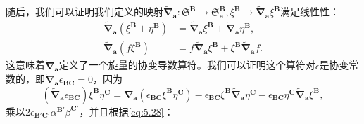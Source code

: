 随后，我们可以证明我们定义的映射$\tilde{\boldsymbol{\nabla }}_{\boldsymbol{a}} :\mathfrak{S}^{\boldsymbol{B}}\rightarrow \mathfrak{S}_{\boldsymbol{a}}^{\boldsymbol{B}} ,\xi ^{\boldsymbol{B}}\rightarrow \tilde{\boldsymbol{\nabla }}_{\boldsymbol{a}} \xi ^{\boldsymbol{B}}$满足线性性：
\begin{equation*}
	\begin{aligned}
		\tilde{\boldsymbol{\nabla }}_{\boldsymbol{a}} (\xi ^{\boldsymbol{B}} +\eta ^{\boldsymbol{B}} ) & =\tilde{\boldsymbol{\nabla }}_{\boldsymbol{a}} \xi ^{\boldsymbol{B}} +\tilde{\boldsymbol{\nabla }}_{\boldsymbol{a}} \eta ^{\boldsymbol{B}} ,\\
		\tilde{\boldsymbol{\nabla }}_{\boldsymbol{a}} (f\xi ^{\boldsymbol{B}} ) & =f\tilde{\boldsymbol{\nabla }}_{\boldsymbol{a}} \xi ^{\boldsymbol{B}} +\xi ^{\boldsymbol{B}}\tilde{\boldsymbol{\nabla }}_{\boldsymbol{a}} f.
	\end{aligned}
\end{equation*}
这意味着$\tilde{\boldsymbol{\nabla }}_{\boldsymbol{a}}$定义了一个旋量的协变导数算符。我们可以证明这个算符对$\epsilon $是协变常数的，即$\tilde{\boldsymbol{\nabla }}_{\boldsymbol{a}} \epsilon _{\boldsymbol{BC}} =0$，因为
\begin{equation}
	(\tilde{\boldsymbol{\nabla }}_{\boldsymbol{a}} \epsilon _{\boldsymbol{BC}} )\xi ^{\boldsymbol{B}} \eta ^{\boldsymbol{C}} =\boldsymbol{\nabla }_{\boldsymbol{a}} (\epsilon _{\boldsymbol{BC}} \xi ^{\boldsymbol{B}} \eta ^{\boldsymbol{C}} )-\epsilon _{\boldsymbol{BC}} \xi ^{\boldsymbol{B}}\tilde{\boldsymbol{\nabla }}_{\boldsymbol{a}} \eta ^{\boldsymbol{C}} -\epsilon _{\boldsymbol{BC}} \eta ^{\boldsymbol{C}}\tilde{\boldsymbol{\nabla }}_{\boldsymbol{a}} \xi ^{\boldsymbol{B}} ,
	\label{eq:5.30}
\end{equation}
乘以$2\epsilon _{\boldsymbol{B} '\boldsymbol{C} '} \alpha ^{\boldsymbol{B} '} \beta ^{\boldsymbol{C} '}$，并且根据\ref{eq:5.28}：
